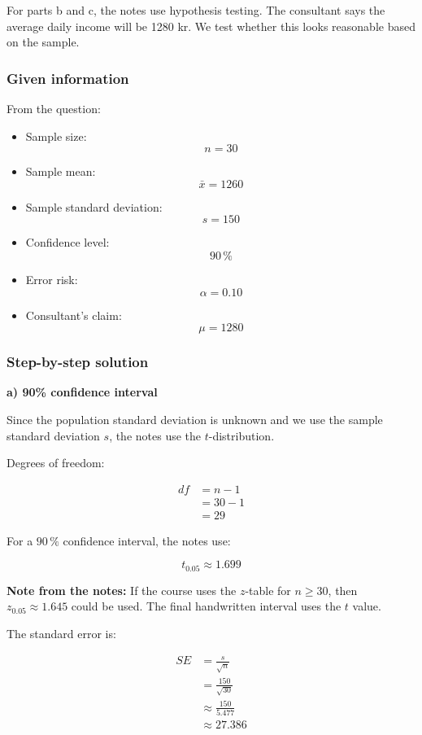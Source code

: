 \documentclass[10pt]{article}
\begin{document}
For parts b and c, the notes use hypothesis testing.
The consultant says the average daily income will be 1280 kr.
We test whether this looks reasonable based on the sample.

\subsubsection*{Given information}
From the question:

\begin{itemize}
\item Sample size:
\[
n=30
\]
\item Sample mean:
\[
\bar{x}=1260
\]
\item Sample standard deviation:
\[
s=150
\]
\item Confidence level:
\[
90\,\%
\]
\item Error risk:
\[
\alpha=0.10
\]
\item Consultant's claim:
\[
\mu=1280
\]
\end{itemize}

\subsubsection*{Step-by-step solution}

\RepeatedQuestion{\uppgiftSixQuestion}
\textbf{a) 90\% confidence interval}

Since the population standard deviation is unknown and we use
the sample standard deviation $s$, the notes use the
$t$-distribution.

Degrees of freedom:

\begin{align*}
df
&=n-1 \\[2mm]
&=30-1 \\[2mm]
&=29
\end{align*}

For a $90\,\%$ confidence interval, the notes use:

\[
t_{0.05}\approx 1.699
\]

\textbf{Note from the notes:}
If the course uses the $z$-table for $n\geq 30$, then
$z_{0.05}\approx 1.645$ could be used.
The final handwritten interval uses the $t$ value.

The standard error is:

\begin{align*}
SE
&=
\frac{s}{\sqrt{n}} \\[2mm]
&=
\frac{150}{\sqrt{30}} \\[2mm]
&\approx
\frac{150}{5.477} \\[2mm]
&\approx 27.386
\end{align*}
\end{document}
